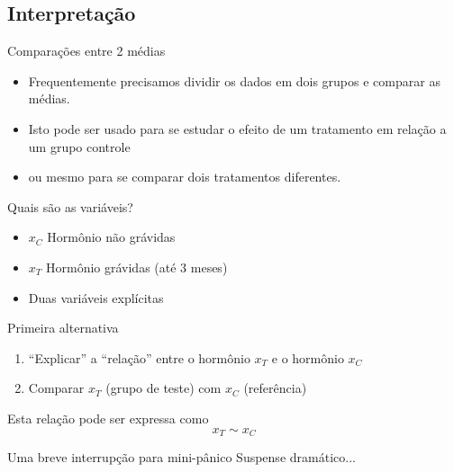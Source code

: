 \documentclass{beamer}
\begin{document}
\subsection{Interpretação}

\begin{frame}{\scriptsize Comparações entre 2 médias}
  \begin{itemize}
    \footnotesize
  \item Frequentemente precisamos dividir os dados em dois grupos e
    comparar as médias.

    \bigskip
  \item Isto pode ser usado para se estudar o efeito de um tratamento
    em relação a um grupo controle

    \bigskip
  \item ou mesmo para se comparar dois tratamentos diferentes.
  \end{itemize}
\end{frame}


\begin{frame}{\scriptsize Quais são as variáveis?}
  \begin{itemize}
    \footnotesize
  \item $x_C$ Hormônio não grávidas
  \item $x_T$ Hormônio grávidas (até 3 meses)
  \item Duas variáveis explícitas
  \end{itemize}
  \begin{block}{Primeira alternativa}
    \small
    \begin{enumerate}
      \footnotesize
    \item``Explicar'' a ``relação'' entre o hormônio $x_T$ e o hormônio $x_C$%
    \item Comparar $x_T$ (grupo de teste) com $x_C$ (referência)%
    \end{enumerate}
  \end{block}
  \begin{block}{Esta relação pode ser expressa como}
    \begin{displaymath}
      x_T \sim x _C
    \end{displaymath}
  \end{block}
\end{frame}

\begin{frame}{\scriptsize Uma breve interrupção para mini-pânico}
  \vfill
  \vfill
  \vfill
  \vfill
  \vfill
  \hfill \small Suspense dramático...
\end{frame}
\end{document}
